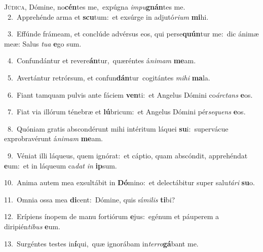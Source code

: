 \lettrine{\initial\textcolor{\initialcolor}{J}}{údica,} Dómine, no\-\textbf{cén}\-tes me,~\star expúgna \textit{im}\-\textit{pu}\textbf{gnán}tes me.\\
{\numbfont\textcolor{\numbcolor}{~2.}}~Apprehénde arma et \textbf{scu}\-tum:~\star et exsúrge in adjutó\-\textit{ri}\-\textit{um} \textbf{mi}\-hi.\par
{\numbfont\textcolor{\numbcolor}{~3.}}~Effúnde frámeam, et conclúde advérsus eos, qui perse\-\textbf{quún}\-tur me:~\star dic ánimæ meæ: Salus \textit{tu}\-\textit{a} \textbf{e}\-go sum.\par
{\numbfont\textcolor{\numbcolor}{~4.}}~Confundántur et revere\-\textbf{án}\-tur,~\star quæréntes á\-\textit{ni}\-\textit{mam} \textbf{me}\-am.\par
{\numbfont\textcolor{\numbcolor}{~5.}}~Avertántur retrórsum, et confun\-\textbf{dán}\-tur~\star cogitántes \textit{mi}\-\textit{hi} \textbf{ma}\-la.\par
{\numbfont\textcolor{\numbcolor}{~6.}}~Fiant tamquam pulvis ante fáciem \textbf{ven}\-ti:~\star et Angelus Dómini co\-\textit{árc}\-\textit{tans} \textbf{e}\-os.\par
{\numbfont\textcolor{\numbcolor}{~7.}}~Fiat via illórum ténebræ et \textbf{lú}\-bricum:~\star et Angelus Dómini pér\-\textit{se}\-\textit{quens} \textbf{e}\-os.\par
{\numbfont\textcolor{\numbcolor}{~8.}}~Quóniam gratis abscondérunt mihi intéritum láquei \textbf{su}\-i:~\star supervácue exprobravérunt á\-\textit{ni}\-\textit{mam} \textbf{me}\-am.\par
{\numbfont\textcolor{\numbcolor}{~9.}}~Véniat illi láqueus, quem ignórat:~\dagger et cáptio, quam abscóndit, apprehéndat \textbf{e}\-um:~\star et in láqueum ca\textit{dat} \textit{in} \textbf{ip}\-sum.\par
{\numbfont\textcolor{\numbcolor}{10.}}~Anima autem mea exsultábit in \textbf{Dó}\-mino:~\star et delectábitur super salu\-\textit{tá}\-\textit{ri} \textbf{su}\-o.\par
{\numbfont\textcolor{\numbcolor}{11.}}~Omnia ossa mea \textbf{di}\-cent:~\star Dómine, quis sí\-\textit{mi}\-\textit{lis} \textbf{ti}\-bi?\par
{\numbfont\textcolor{\numbcolor}{12.}}~Erípiens ínopem de manu fortiórum \textbf{e}\-jus:~\star egénum et páuperem a diripién\-\textit{ti}\-\textit{bus} \textbf{e}\-um.\par
{\numbfont\textcolor{\numbcolor}{13.}}~Surgéntes testes in\-\textbf{í}\-qui,~\star quæ ignorábam in\-\textit{ter}\-\textit{ro}\textbf{gá}bant me.\par
